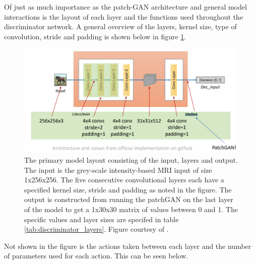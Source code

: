 \documentclass[12pt, fleqn, titlepage]{article}
\newcommand{\1}[1]{\mathds{1}\left[#1\right]}
\begin{document}
Of just as much importance as the patch-GAN architecture and general model interactions is the layout of each layer and the functions used throughout the discriminator network. A general overview of the layers, kernel size, type of convolution, stride and padding is shown below in figure \ref{fig:cyclegandiscriminatorlayers}.
\begin{figure}[H]
	\centering
	\includegraphics[width=0.7\linewidth]{imgs/cyclegan_discriminator_layers}
	\caption{The primary model layout consisting of the input, layers and output. The input is the grey-scale intensity-based MRI input of size 1x256x256. The five consecutive convolutional layers each have a specified kernel size, stride and padding as noted in the figure. The output is constructed from running the patchGAN on the last layer of the model to get a 1x30x30 matrix of values between 0 and 1. The specific values and layer sizes are specifed in table \ref{tab:discriminator_layers}. Figure courtesy of \cite{cyclegan_figures}.}
	\label{fig:cyclegandiscriminatorlayers}
\end{figure}

Not shown in the figure is the actions taken between each layer and the number of parameters used for each action. This can be seen below. 
\end{document}
